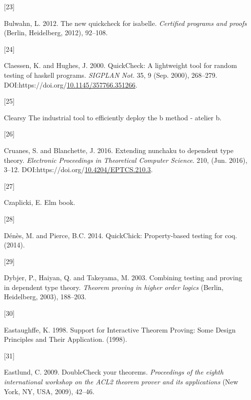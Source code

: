 \documentclass[
]{article}
\newlength{\cslhangindent}
\newlength{\csllabelwidth}
\newlength{\cslentryspacingunit} %
\newenvironment{CSLReferences}[2] %
 {%
  \setlength{\parindent}{0pt}
  \ifodd #1
  \let\oldpar\par
  \def\par{\hangindent=\cslhangindent\oldpar}
  \fi
  \setlength{\parskip}{#2\cslentryspacingunit}
 }%
 {}
\newcommand{\CSLLeftMargin}[1]{\parbox[t]{\csllabelwidth}{#1}}
\newcommand{\CSLRightInline}[1]{\parbox[t]{\linewidth - \csllabelwidth}{#1}\break}
\begin{document}
\begin{CSLReferences}{0}{0}
\leavevmode{}%
\CSLLeftMargin{{[}23{]} }
\CSLRightInline{Bulwahn, L. 2012. The new quickcheck for isabelle.
\emph{Certified programs and proofs} (Berlin, Heidelberg, 2012),
92--108.}

\leavevmode{}%
\CSLLeftMargin{{[}24{]} }
\CSLRightInline{Claessen, K. and Hughes, J. 2000. QuickCheck: A
lightweight tool for random testing of haskell programs. \emph{SIGPLAN
Not.} 35, 9 (Sep. 2000), 268--279.
DOI:https://doi.org/\href{https://doi.org/10.1145/357766.351266}{10.1145/357766.351266}.}

\leavevmode{}%
\CSLLeftMargin{{[}25{]} }
\CSLRightInline{Clearsy The industrial tool to efficiently deploy the b
method - atelier b.}

\leavevmode{}%
\CSLLeftMargin{{[}26{]} }
\CSLRightInline{Cruanes, S. and Blanchette, J. 2016. Extending nunchaku
to dependent type theory. \emph{Electronic Proceedings in Theoretical
Computer Science}. 210, (Jun. 2016), 3--12.
DOI:https://doi.org/\href{https://doi.org/10.4204/EPTCS.210.3}{10.4204/EPTCS.210.3}.}

\leavevmode{}%
\CSLLeftMargin{{[}27{]} }
\CSLRightInline{Czaplicki, E. Elm book.}

\leavevmode{}%
\CSLLeftMargin{{[}28{]} }
\CSLRightInline{Dénès, M. and Pierce, B.C. 2014. QuickChick:
Property-based testing for coq. (2014).}

\leavevmode{}%
\CSLLeftMargin{{[}29{]} }
\CSLRightInline{Dybjer, P., Haiyan, Q. and Takeyama, M. 2003. Combining
testing and proving in dependent type theory. \emph{Theorem proving in
higher order logics} (Berlin, Heidelberg, 2003), 188--203.}

\leavevmode{}%
\CSLLeftMargin{{[}30{]} }
\CSLRightInline{Eastaughffe, K. 1998. Support for {Interactive}
{Theorem} {Proving}: {Some} {Design} {Principles} and {Their}
{Application}. (1998).}

\leavevmode{}%
\CSLLeftMargin{{[}31{]} }
\CSLRightInline{Eastlund, C. 2009. DoubleCheck your theorems.
\emph{Proceedings of the eighth international workshop on the ACL2
theorem prover and its applications} (New York, NY, USA, 2009), 42--46.}


\end{CSLReferences}
\end{document}
